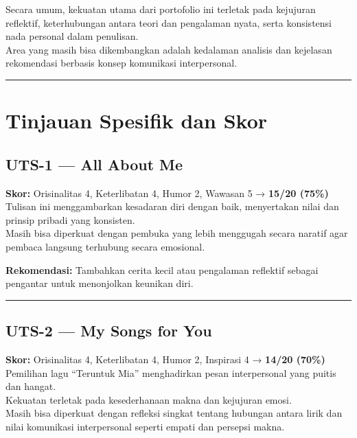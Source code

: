 \documentclass[
  letterpaper,
  DIV=11,
  numbers=noendperiod]{scrreprt}
\begin{document}
Secara umum, kekuatan utama dari portofolio ini terletak pada kejujuran
reflektif, keterhubungan antara teori dan pengalaman nyata, serta
konsistensi nada personal dalam penulisan.\\
Area yang masih bisa dikembangkan adalah kedalaman analisis dan
kejelasan rekomendasi berbasis konsep komunikasi interpersonal.

\begin{center}\rule{0.5\linewidth}{0.5pt}\end{center}

\section{Tinjauan Spesifik dan Skor}\label{tinjauan-spesifik-dan-skor}

\subsection{UTS-1 --- All About Me}\label{uts-1-all-about-me-1}

\textbf{Skor:} Orisinalitas 4, Keterlibatan 4, Humor 2, Wawasan 5 →
\textbf{15/20 (75\%)}\\
Tulisan ini menggambarkan kesadaran diri dengan baik, menyertakan nilai
dan prinsip pribadi yang konsisten.\\
Masih bisa diperkuat dengan pembuka yang lebih menggugah secara naratif
agar pembaca langsung terhubung secara emosional.

\textbf{Rekomendasi:} Tambahkan cerita kecil atau pengalaman reflektif
sebagai pengantar untuk menonjolkan keunikan diri.

\begin{center}\rule{0.5\linewidth}{0.5pt}\end{center}

\subsection{UTS-2 --- My Songs for You}\label{uts-2-my-songs-for-you-1}

\textbf{Skor:} Orisinalitas 4, Keterlibatan 4, Humor 2, Inspirasi 4 →
\textbf{14/20 (70\%)}\\
Pemilihan lagu ``Teruntuk Mia'' menghadirkan pesan interpersonal yang
puitis dan hangat.\\
Kekuatan terletak pada kesederhanaan makna dan kejujuran emosi.\\
Masih bisa diperkuat dengan refleksi singkat tentang hubungan antara
lirik dan nilai komunikasi interpersonal seperti empati dan persepsi
makna.
\end{document}
